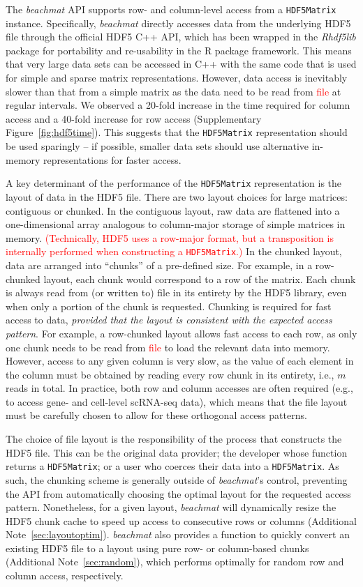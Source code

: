 \documentclass{article}
\newcommand{\beachmat}{\textit{beachmat}}
\newcommand{\code}[1]{\texttt{#1}}
\newcommand{\revised}[1]{\textcolor{red}{#1}}
\begin{document}
The \beachmat{} API supports row- and column-level access from a \code{HDF5Matrix} instance.
Specifically, \beachmat{} directly accesses data from the underlying HDF5 file through the official HDF5 C++ API, which has been wrapped in the \textit{Rhdf5lib} package for portability and re-usability in the R package framework.
This means that very large data sets can be accessed in C++ with the same code that is used for simple and sparse matrix representations.
However, data access is inevitably slower than that from a simple matrix as the data need to be read from \revised{file} at regular intervals.
We observed a 20-fold increase in the time required for column access and a 40-fold increase for row access (Supplementary Figure~\ref{fig:hdf5time}).
This suggests that the \code{HDF5Matrix} representation should be used sparingly -- if possible, smaller data sets should use alternative in-memory representations for faster access.

A key determinant of the performance of the \code{HDF5Matrix} representation is the layout of data in the HDF5 file.
There are two layout choices for large matrices: contiguous or chunked.
In the contiguous layout, raw data are flattened into a one-dimensional array analogous to column-major storage of simple matrices in memory.
\revised{(Technically, HDF5 uses a row-major format, but a transposition is internally performed when constructing a \code{HDF5Matrix}.)}
In the chunked layout, data are arranged into ``chunks'' of a pre-defined size.
For example, in a row-chunked layout, each chunk would correspond to a row of the matrix.
Each chunk is always read from (or written to) file in its entirety by the HDF5 library, even when only a portion of the chunk is requested.
Chunking is required for fast access to data, \textit{provided that the layout is consistent with the expected access pattern}.
For example, a row-chunked layout allows fast access to each row, as only one chunk needs to be read from \revised{file} to load the relevant data into memory.
However, access to any given column is very slow, as the value of each element in the column must be obtained by reading every row chunk in its entirety, i.e., $m$ reads in total.
In practice, both row and column accesses are often required (e.g., to access gene- and cell-level scRNA-seq data), which means that the file layout must be carefully chosen to allow for these orthogonal access patterns.

The choice of file layout is the responsibility of the process that constructs the HDF5 file.
This can be the original data provider; the developer whose function returns a \code{HDF5Matrix}; or a user who coerces their data into a \code{HDF5Matrix}.
As such, the chunking scheme is generally outside of \beachmat{}'s control, preventing the API from automatically choosing the optimal layout for the requested access pattern.
Nonetheless, for a given layout, \beachmat{} will dynamically resize the HDF5 chunk cache to speed up access to consecutive rows or columns (Additional Note~\ref{sec:layoutoptim}).
\beachmat{} also provides a function to quickly convert an existing HDF5 file to a layout using pure row- or column-based chunks (Additional Note~\ref{sec:random}), which performs optimally for random row and column access, respectively.
\end{document}
